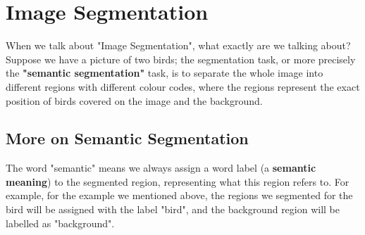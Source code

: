 \section{Image Segmentation}
When we talk about "Image Segmentation", what exactly are we talking about? Suppose we have a picture of two birds; the segmentation task, or more precisely the \textbf{"semantic segmentation"} task, is to separate the whole image into different regions with different colour codes, where the regions represent the exact position of birds covered on the image and the background. 
\subsection{More on Semantic Segmentation}
The word "semantic" means we always assign a word label (a \textbf{semantic meaning}) to the segmented region, representing what this region refers to. For example, for the example we mentioned above, the regions we segmented for the bird will be assigned with the label "bird", and the background region will be labelled as "background".

